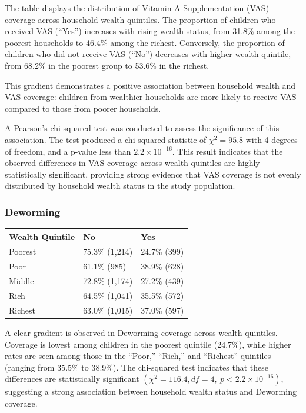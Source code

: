 \documentclass[
  11pt,
]{report}
\begin{document}
The table displays the distribution of Vitamin A Supplementation (VAS)
coverage across household wealth quintiles. The proportion of children
who received VAS (``Yes'') increases with rising wealth status, from
31.8\% among the poorest households to 46.4\% among the richest.
Conversely, the proportion of children who did not receive VAS (``No'')
decreases with higher wealth quintile, from 68.2\% in the poorest group
to 53.6\% in the richest.

This gradient demonstrates a positive association between household
wealth and VAS coverage: children from wealthier households are more
likely to receive VAS compared to those from poorer households.

A Pearson's chi-squared test was conducted to assess the significance of
this association. The test produced a chi-squared statistic of
\(\chi^2 = 95.8\) with 4 degrees of freedom, and a p-value less than
\(2.2 \times 10^{-16}\). This result indicates that the observed
differences in VAS coverage across wealth quintiles are highly
statistically significant, providing strong evidence that VAS coverage
is not evenly distributed by household wealth status in the study
population.

\subsubsection{Deworming}\label{deworming}

\begin{longtable}[]{@{}lll@{}}
\toprule\noalign{}
Wealth Quintile & No & Yes \\
\midrule\noalign{}
\endhead
\bottomrule\noalign{}
\endlastfoot
Poorest & 75.3\% (1,214) & 24.7\% (399) \\
Poor & 61.1\% (985) & 38.9\% (628) \\
Middle & 72.8\% (1,174) & 27.2\% (439) \\
Rich & 64.5\% (1,041) & 35.5\% (572) \\
Richest & 63.0\% (1,015) & 37.0\% (597) \\
\end{longtable}

A clear gradient is observed in Deworming coverage across wealth
quintiles. Coverage is lowest among children in the poorest quintile
(24.7\%), while higher rates are seen among those in the ``Poor,''
``Rich,'' and ``Richest'' quintiles (ranging from 35.5\% to 38.9\%). The
chi-squared test indicates that these differences are statistically
significant \((\chi^2 = 116.4, df = 4, \ p < 2.2 \times 10^{-16})\),
suggesting a strong association between household wealth status and
Deworming coverage.
\end{document}
